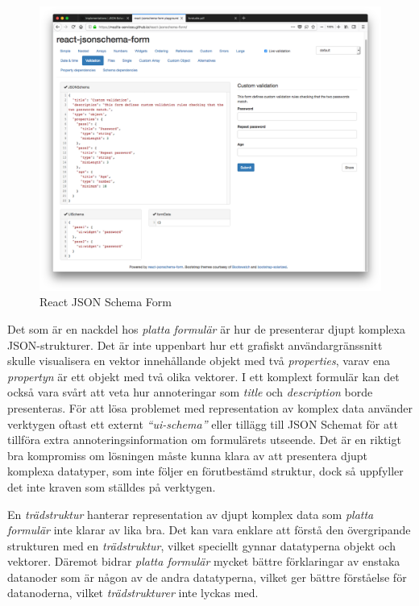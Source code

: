 \begin{figure}
	\includegraphics[width=\textwidth]{./images/screenshot-react-jsonschema-form.png}
	\vspace{-1.7em}
	\caption{React JSON Schema Form \cite{MozillaServices}}
	\label{fig:react-jsonschema-form}
\end{figure}

Det som är en nackdel hos \textit{platta formulär} är hur de presenterar djupt komplexa JSON-strukturer. Det är inte uppenbart hur ett grafiskt användargränssnitt skulle visualisera en vektor innehållande objekt med två \textit{properties}, varav ena \textit{propertyn} är ett objekt med två olika vektorer. I ett komplext formulär kan det också vara svårt att veta hur annoteringar som \textit{title} och \textit{description} borde presenteras. För att lösa problemet med representation av komplex data använder verktygen oftast ett externt \textit{``ui-schema''} eller tillägg till JSON Schemat för att tillföra extra annoteringsinformation om formulärets utseende. Det är en riktigt bra kompromiss om lösningen måste kunna klara av att presentera djupt komplexa datatyper, som inte följer en förutbestämd struktur, dock så uppfyller det inte kraven som ställdes på verktygen.

En \textit{trädstruktur} hanterar representation av djupt komplex data som \textit{platta formulär} inte klarar av lika bra. Det kan vara enklare att förstå den övergripande strukturen med en \textit{trädstruktur}, vilket speciellt gynnar datatyperna objekt och vektorer. Däremot bidrar \textit{platta formulär} mycket bättre förklaringar av enstaka datanoder som är någon av de andra datatyperna, vilket ger bättre förståelse för datanoderna, vilket \textit{trädstrukturer} inte lyckas med.
